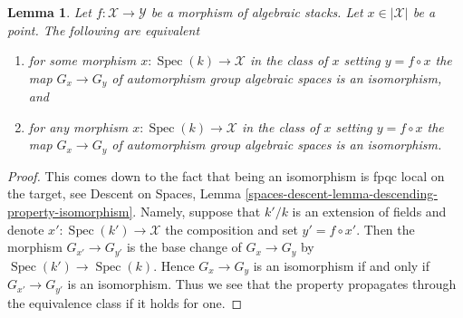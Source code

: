 \documentclass[10pt,a4paper]{amsart}
\theoremstyle{plain}
\newtheorem{lemma}[subsection]{Lemma}
\theoremstyle{definition}
\theoremstyle{remark}
\numberwithin{equation}{subsection}
\def\Spec{\mathop{\mathrm{Spec}}}
\begin{document}
\begin{lemma}
\label{lemma-iso-automorphism-groups}
Let $f : \mathcal{X} \to \mathcal{Y}$ be a morphism of algebraic stacks.
Let $x \in |\mathcal{X}|$ be a point. The following are equivalent
\begin{enumerate}
\item for some morphism $x : \Spec(k) \to \mathcal{X}$ in the
class of $x$ setting $y = f \circ x$ the map
$G_x \to G_y$ of automorphism group algebraic spaces
is an isomorphism, and
\item for any morphism $x : \Spec(k) \to \mathcal{X}$ in the
class of $x$ setting $y = f \circ x$ the map
$G_x \to G_y$ of automorphism group algebraic spaces
is an isomorphism.
\end{enumerate}
\end{lemma}

\begin{proof}
This comes down to the fact that being an isomorphism
is fpqc local on the target, see
Descent on Spaces, Lemma
\ref{spaces-descent-lemma-descending-property-isomorphism}.
Namely, suppose that $k'/k$ is an extension of fields and
denote $x' : \Spec(k') \to \mathcal{X}$ the composition
and set $y' = f \circ x'$.
Then the morphism $G_{x'} \to G_{y'}$ is the base change
of $G_x \to G_y$ by $\Spec(k') \to \Spec(k)$.
Hence $G_x \to G_y$ is an isomorphism
if and only if $G_{x'} \to G_{y'}$ is an isomorphism.
Thus we see that the property propagates through the
equivalence class if it holds for one.
\end{proof}
\end{document}
